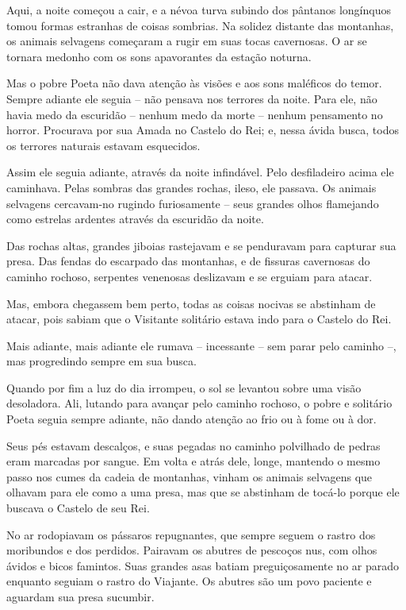 Aqui, a noite começou a cair, e a névoa turva subindo dos pântanos
longínquos tomou formas estranhas de coisas sombrias. Na solidez
distante das montanhas, os animais selvagens começaram a rugir em suas
tocas cavernosas. O ar se tornara medonho com os sons apavorantes da
estação noturna.

Mas o pobre Poeta não dava atenção às visões e aos sons maléficos do
temor. Sempre adiante ele seguia -- não pensava nos terrores da noite.
Para ele, não havia medo da escuridão -- nenhum medo da morte -- nenhum
pensamento no horror. Procurava por sua Amada no Castelo do Rei; e,
nessa ávida busca, todos os terrores naturais estavam esquecidos.

Assim ele seguia adiante, através da noite infindável. Pelo desfiladeiro
acima ele caminhava. Pelas sombras das grandes rochas, ileso, ele
passava. Os animais selvagens cercavam-no rugindo furiosamente -- seus
grandes olhos flamejando como estrelas ardentes através da escuridão da
noite.

Das rochas altas, grandes jiboias rastejavam e se penduravam para
capturar sua presa. Das fendas do escarpado das montanhas, e de fissuras
cavernosas do caminho rochoso, serpentes venenosas deslizavam e se
erguiam para atacar.

Mas, embora chegassem bem perto, todas as coisas nocivas se abstinham de
atacar, pois sabiam que o Visitante solitário estava indo para o Castelo
do Rei.

Mais adiante, mais adiante ele rumava -- incessante -- sem parar pelo
caminho --, mas progredindo sempre em sua busca.

Quando por fim a luz do dia irrompeu, o sol se levantou sobre uma visão
desoladora. Ali, lutando para avançar pelo caminho rochoso, o pobre e
solitário Poeta seguia sempre adiante, não dando atenção ao frio ou à
fome ou à dor.

Seus pés estavam descalços, e suas pegadas no caminho polvilhado de
pedras eram marcadas por sangue. Em volta e atrás dele, longe, mantendo
o mesmo passo nos cumes da cadeia de montanhas, vinham os animais
selvagens que olhavam para ele como a uma presa, mas que se abstinham de
tocá-lo porque ele buscava o Castelo de seu Rei.

No ar rodopiavam os pássaros repugnantes, que sempre seguem o rastro dos
moribundos e dos perdidos. Pairavam os abutres de pescoços nus, com
olhos ávidos e bicos famintos. Suas grandes asas batiam preguiçosamente
no ar parado enquanto seguiam o rastro do Viajante. Os abutres são um
povo paciente e aguardam sua presa sucumbir.

